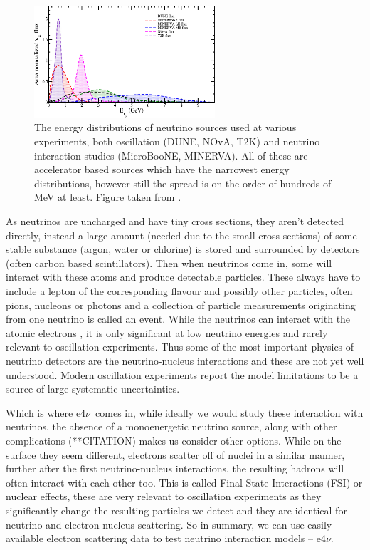 \documentclass[a4paper,12pt]{article}
\newcommand{\efn}{e4$\nu$}
\begin{document}
\begin{figure}[H]
    \centering
    \includegraphics[width=0.6\textwidth]{figures/sourceEnergies.pdf}
    \caption{
        The energy distributions of neutrino sources used at various experiments, both oscillation (DUNE, NOvA, T2K) and neutrino interaction studies (MicroBooNE, MINERVA).
        All of these are accelerator based sources which have the narrowest energy distributions, however still the spread is on the order of hundreds of \si{MeV} at least.
        Figure taken from \cite{sajjadatharNeutrinosTheirInteractions2023}.
    }\label{fig:neu_s_Es}
\end{figure}

As neutrinos are uncharged and have tiny cross sections, they aren't detected directly, instead a large amount (needed due to the small cross sections) of some stable substance (argon, water or chlorine) is stored and surrounded by detectors (often carbon based scintillators).
Then when neutrinos come in, some will interact with these atoms and produce detectable particles.
These always have to include a lepton of the corresponding flavour and possibly other particles, often pions, nucleons or photons and a collection of particle measurements originating from one neutrino is called an event.
While the neutrinos can interact with the atomic electrons \cite{whittinghamScatteringLowEnergy2022}, it is only significant at low neutrino energies and rarely relevant to oscillation experiments.
Thus some of the most important physics of neutrino detectors are the neutrino-nucleus interactions and these are not yet well understood.
Modern oscillation experiments report the model limitations to be a source of large systematic uncertainties\cite{abeConstraintMatterAntimatter2020,novacollaborationNewConstraintsOscillation2018}.

Which is where \efn\ comes in, while ideally we would study these interaction with neutrinos, the absence of a monoenergetic neutrino source, along with other complications (**CITATION) makes us consider other options.
While on the surface they seem different, electrons scatter off of nuclei in a similar manner, further after the first neutrino-nucleus interactions, the resulting hadrons will often interact with each other too.
This is called Final State Interactions (FSI) or nuclear effects, these are very relevant to oscillation experiments as they significantly change the resulting particles we detect and they are identical for neutrino and electron-nucleus scattering.
So in summary, we can use easily available electron scattering data to test neutrino interaction models -- \efn.
\end{document}
